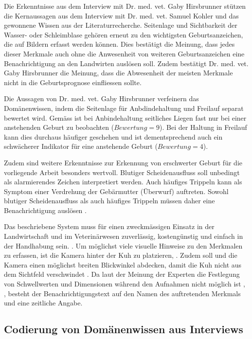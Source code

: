 Die Erkenntnisse aus dem Interview mit Dr. med. vet. Gaby Hirsbrunner \citep{Hirsbrunner2020} stützen die Kernaussagen aus dem Interview mit Dr. med. vet. Samuel Kohler und das gewonnene Wissen aus der Literaturrecherche. Seitenlage und Sichtbarkeit der Wasser- oder Schleimblase gehören erneut zu den wichtigsten Geburtsanzeichen, die auf Bildern erfasst werden können. Dies bestätigt die Meinung, dass jedes dieser Merkmale auch ohne die Anwesenheit von weiteren Geburtsanzeichen eine Benachrichtigung an den Landwirten auslösen soll. Zudem bestätigt Dr. med. vet. Gaby Hirsbrunner	die Meinung, dass die Abwesenheit der meisten Merkmale nicht in die Geburtsprognose einfliessen sollte.  

Die Aussagen von Dr. med. vet. Gaby Hirsbrunner verfeinern das Domänenwissen, indem die Seitenlage für Anbdindehaltung und Freilauf separat bewertet wird. Gemäss \citep{Hirsbrunner2020} ist bei Anbindehaltung seitliches Liegen fast nur bei einer anstehenden Geburt zu beobachten ($Bewertung=9$). Bei der Haltung in Freilauf kann dies durchaus häufiger geschehen und ist dementsprechend auch ein schwächerer Indikator für eine anstehende Geburt ($Bewertung=4$).

Zudem sind weitere Erkenntnisse zur Erkennung von erschwerter Geburt für die vorliegende Arbeit besonders wertvoll. Blutiger Scheidenausfluss soll unbedingt als alarmierendes Zeichen interpretiert werden. Auch häufiges Trippeln kann als Symptom einer Verdrehung der Gebärmutter (Überwurf) auftreten. Sowohl blutiger Scheidenausfluss als auch häufiges Trippeln müssen daher eine Benachrichtigung auslösen \citep{Hirsbrunner2020}.

Das beschriebene System muss für einen zweckmässigen Einsatz in der Landwirtschaft und im Veterinärwesen zuverlässig, kostengünstig und einfach in der Handhabung sein. \citep{Hirsbrunner2020}. Um möglichst viele visuelle Hinweise zu den Merkmalen zu erfassen, ist die Kamera hinter der Kuh zu platzieren\citep{Hirsbrunner2020}, \citep{Kohler2020}. Zudem soll und die Kamera einen möglichst breiten Blickwinkel abdecken, damit die Kuh nicht aus dem Sichtfeld verschwindet \cite{Muller2020}. Da laut der Meinung der Experten die Festlegung von Schwellwerten und Dimensionen während den Aufnahmen nicht möglich ist \citep{Hirsbrunner2020}, \citep{Kohler2020}, besteht der Benachrichtigungstext auf den Namen des auftretenden Merkmals und eine zeitliche Angabe.

\subsection{Codierung von Domänenwissen aus Interviews}

